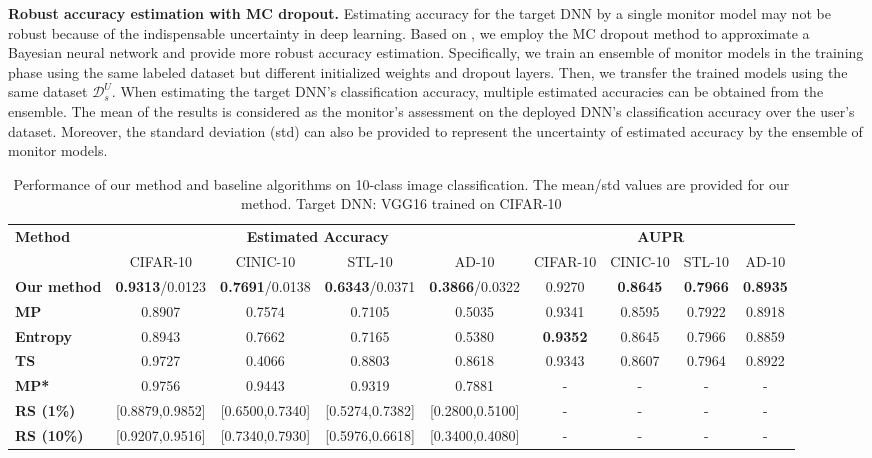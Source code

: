 \documentclass{article}
\begin{document}
\textbf{Robust accuracy estimation with MC dropout.} Estimating accuracy for the target DNN by a single monitor model may not be robust because of the indispensable uncertainty in deep learning.  Based on \cite{MC_dropout_approximation_2016}, we employ
the  MC dropout method to approximate a Bayesian neural network and provide more robust accuracy estimation. 
Specifically, we train an ensemble of monitor models in the training phase using the same labeled dataset but different initialized weights and dropout layers. Then, we transfer the trained models using the same dataset $\mathcal{D}_s^U$. When estimating the target DNN's classification accuracy, multiple estimated accuracies can be obtained from the ensemble. The mean of the results is considered as the monitor's
assessment on the deployed DNN's classification accuracy over the user's dataset.
Moreover,
the standard deviation (std) can also be provided to represent the uncertainty of estimated accuracy by the ensemble of monitor models. \begin{table*}[!t]
	\centering
	\caption{Performance of our method and baseline algorithms on 10-class image classification. The mean/std values are provided for our method. Target DNN: VGG16 trained on CIFAR-10}
	\setlength{\tabcolsep}{5pt}
	\vspace{-0.1cm}
	\small

	\begin{tabular}{l|cccc|cccc}
		\hline
		\multirow{2}{*}{\textbf{Method}} & \multicolumn{4}{c|}{\textbf{Estimated Accuracy}} & \multicolumn{4}{c}{\textbf{AUPR}} \\
		\cline{2-9}      & CIFAR-10 & CINIC-10 & STL-10 & AD-10 & CIFAR-10 & CINIC-10 & STL-10 & AD-10 \\
		\hline
		\multicolumn{1}{l|}{\textbf{Our method}} & \textbf{0.9313}/0.0123 & \textbf{0.7691}/0.0138 & \textbf{0.6343}/0.0371 & \textbf{0.3866}/0.0322 & 0.9270 & \textbf{0.8645} & \textbf{0.7966} & \textbf{0.8935} \\
		\multicolumn{1}{p{5.5em}|}{\textbf{MP}} & 0.8907 & 0.7574 & 0.7105 & 0.5035 & 0.9341 & 0.8595 & 0.7922 & 0.8918 \\
		\multicolumn{1}{p{5.5em}|}{\textbf{Entropy}} & 0.8943 & 0.7662 & 0.7165 & 0.5380 & \textbf{0.9352} & 0.8645 & 0.7966 & 0.8859 \\
		\textbf{TS} & 0.9727 & 0.4066 & 0.8803 & 0.8618 & 0.9343 & 0.8607 & 0.7964 & 0.8922 \\
		\multicolumn{1}{p{5.5em}|}{\textbf{MP*}} & 0.9756 & 0.9443 & 0.9319 & 0.7881 & -     & -     & -     & - \\
		\textbf{RS (1\%)} & [0.8879,0.9852] & [0.6500,0.7340] & [0.5274,0.7382] & [0.2800,0.5100] & -     & -     & -     & - \\
		\textbf{RS (10\%)} & [0.9207,0.9516] & [0.7340,0.7930] & [0.5976,0.6618] & [0.3400,0.4080] & -     & -     & -     & - \\
		\hline
	\end{tabular}\label{tab:DNN_10classy}\vspace{-0.3cm}
\end{table*}
\end{document}
